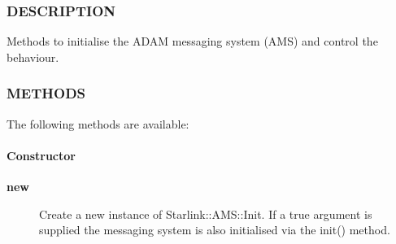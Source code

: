 \subsubsection*{DESCRIPTION\label{ORAC::Msg::Control::AMS_DESCRIPTION}}


Methods to initialise the ADAM messaging system (AMS) and control the
behaviour.

\subsubsection*{METHODS\label{ORAC::Msg::Control::AMS_METHODS}}


The following methods are available:

\paragraph*{Constructor\label{ORAC::Msg::Control::AMS_Constructor}}
\begin{description}

\item[{\textbf{new}}] \mbox{}

Create a new instance of Starlink::AMS::Init.
If a true argument is supplied the messaging system is also
initialised via the init() method.

\end{description}
